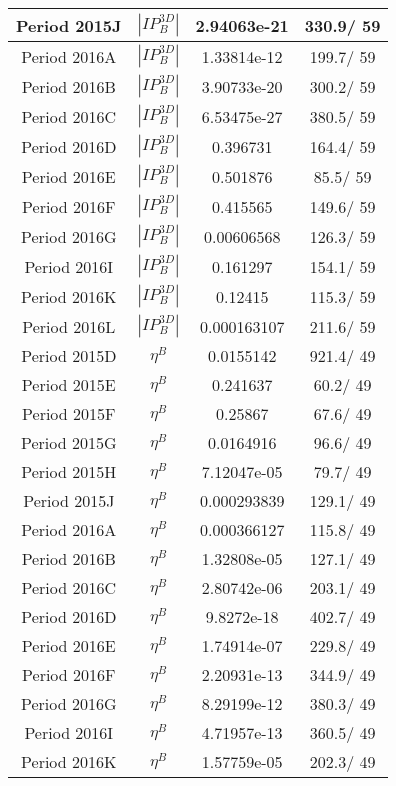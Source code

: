 \documentclass{article}
\begin{document}
\begin{longtable}{c|c|c|c}
\hline
 Period 2015J & $|IP_{B}^{3D}|$ & 2.94063e-21 & 330.9/ 59\\
\hline
 Period 2016A & $|IP_{B}^{3D}|$ & 1.33814e-12 & 199.7/ 59\\
\hline
 Period 2016B & $|IP_{B}^{3D}|$ & 3.90733e-20 & 300.2/ 59\\
\hline
 Period 2016C & $|IP_{B}^{3D}|$ & 6.53475e-27 & 380.5/ 59\\
\hline
 Period 2016D & $|IP_{B}^{3D}|$ & 0.396731 & 164.4/ 59\\
\hline
 Period 2016E & $|IP_{B}^{3D}|$ & 0.501876 &  85.5/ 59\\
\hline
 Period 2016F & $|IP_{B}^{3D}|$ & 0.415565 & 149.6/ 59\\
\hline
 Period 2016G & $|IP_{B}^{3D}|$ & 0.00606568 & 126.3/ 59\\
\hline
 Period 2016I & $|IP_{B}^{3D}|$ & 0.161297 & 154.1/ 59\\
\hline
 Period 2016K & $|IP_{B}^{3D}|$ & 0.12415 & 115.3/ 59\\
\hline
 Period 2016L & $|IP_{B}^{3D}|$ & 0.000163107 & 211.6/ 59\\
\hline
 Period 2015D & $\eta^{B}$ & 0.0155142 & 921.4/ 49\\
\hline
 Period 2015E & $\eta^{B}$ & 0.241637 &  60.2/ 49\\
\hline
 Period 2015F & $\eta^{B}$ & 0.25867 &  67.6/ 49\\
\hline
 Period 2015G & $\eta^{B}$ & 0.0164916 &  96.6/ 49\\
\hline
 Period 2015H & $\eta^{B}$ & 7.12047e-05 &  79.7/ 49\\
\hline
 Period 2015J & $\eta^{B}$ & 0.000293839 & 129.1/ 49\\
\hline
 Period 2016A & $\eta^{B}$ & 0.000366127 & 115.8/ 49\\
\hline
 Period 2016B & $\eta^{B}$ & 1.32808e-05 & 127.1/ 49\\
\hline
 Period 2016C & $\eta^{B}$ & 2.80742e-06 & 203.1/ 49\\
\hline
 Period 2016D & $\eta^{B}$ & 9.8272e-18 & 402.7/ 49\\
\hline
 Period 2016E & $\eta^{B}$ & 1.74914e-07 & 229.8/ 49\\
\hline
 Period 2016F & $\eta^{B}$ & 2.20931e-13 & 344.9/ 49\\
\hline
 Period 2016G & $\eta^{B}$ & 8.29199e-12 & 380.3/ 49\\
\hline
 Period 2016I & $\eta^{B}$ & 4.71957e-13 & 360.5/ 49\\
\hline
 Period 2016K & $\eta^{B}$ & 1.57759e-05 & 202.3/ 49\\

\end{longtable}
\end{document}
